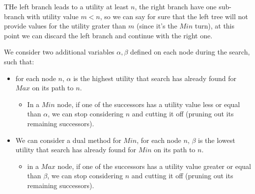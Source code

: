 \documentclass[10pt, letterpaper]{report}
\begin{document}
THe left branch leads to a utility at least $n$, the right branch have one sub-branch with utility value $m<n$, so we can say for sure that the left tree will not provide values for the utility grater than $m$ (since it's the $Min$ turn), at this point we can discard the left branch and continue with the right one.\bigskip

We consider two additional variables $\alpha,\beta$ defined on each node during the search, such that:\begin{itemize}
    \item for each node $n$, $\alpha$ is the highest utility that search has already found for $Max$ on its path to $n$.\begin{itemize}
        \item In a $Min$ node, if one of the successors has a utility value less or equal than $\alpha$, we can stop considering $n$ and cutting it off  (pruning out its remaining successors).
    \end{itemize}
    \item We can consider a dual method for $Min$, for each node $n$, $\beta$ is the lowest utility that search has already found for $Min$ on its path to $n$.\begin{itemize}
        \item in a $Max$ node, if one of the successors has a utility value greater or equal than $\beta$, we can stop considering $n$ and cutting it off  (pruning out its remaining successors).
    \end{itemize}
\end{itemize}
\end{document}
